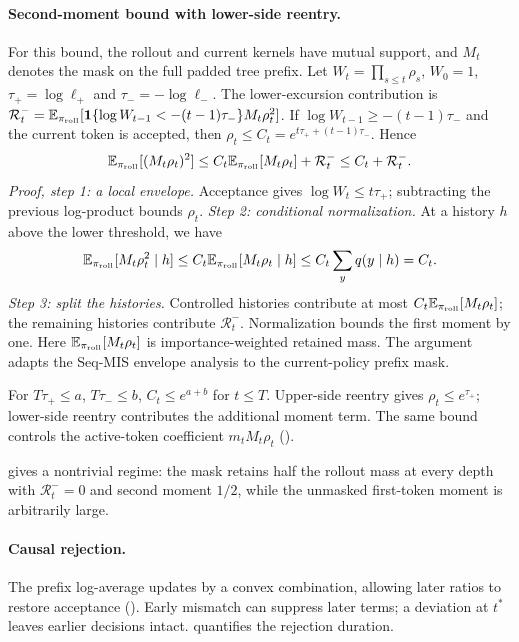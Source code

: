 \paragraph{Second-moment bound with lower-side reentry.}
For this bound, the rollout and current kernels have mutual support,
and $M_t$ denotes the mask on the full padded tree prefix.
Let $W_t=\prod_{s\le t}\rho_s$, $W_0=1$, $\tau_+=\log\ell_+$ and
$\tau_-=-\log\ell_-$. The lower-excursion contribution is
$\mathcal R_t^-=\mathbb E_{\pi_{\mathrm{roll}}}[
\mathbf 1\{\log W_{t-1}<-(t-1)\tau_-\}M_t\rho_t^2]$.
If $\log W_{t-1}\ge-(t-1)\tau_-$ and the current token is accepted,
then $\rho_t\le C_t=e^{t\tau_++(t-1)\tau_-}$. Hence
\[
 \mathbb E_{\pi_{\mathrm{roll}}}[(M_t\rho_t)^2]
 \le C_t\mathbb E_{\pi_{\mathrm{roll}}}[M_t\rho_t]+\mathcal R_t^-
 \le C_t+\mathcal R_t^-.
\]
\emph{Proof, step 1: a local envelope.} Acceptance gives
$\log W_t\le t\tau_+$; subtracting the previous log-product bounds $\rho_t$.
\emph{Step 2: conditional normalization.} At a history $h$ above the
lower threshold, we have
\[
 \mathbb E_{\pi_{\mathrm{roll}}}[M_t\rho_t^2\mid h]
 \le C_t\mathbb E_{\pi_{\mathrm{roll}}}[M_t\rho_t\mid h]
 \le C_t\sum_yq(y\mid h)=C_t.
\]
\emph{Step 3: split the histories.} Controlled histories contribute at most
$C_t\mathbb E_{\pi_{\mathrm{roll}}}[M_t\rho_t]$; the remaining histories contribute
$\mathcal R_t^-$. Normalization bounds the first moment by one.
Here $\mathbb E_{\pi_{\mathrm{roll}}}[M_t\rho_t]$ is importance-weighted retained mass.
The argument adapts the Seq-MIS envelope analysis
\citep[Section~1.3]{li2025sequencemasking} to the current-policy prefix mask.

For $T\tau_+\le a$, $T\tau_-\le b$, $C_t\le e^{a+b}$ for $t\le T$.
Upper-side reentry gives $\rho_t\le e^{\tau_+}$; lower-side reentry
contributes the additional moment term. The same bound controls the active-token
coefficient $m_tM_t\rho_t$ ().

 gives a nontrivial regime: the mask retains
half the rollout mass at every depth with $\mathcal R_t^-=0$ and second
moment $1/2$, while the unmasked first-token moment is arbitrarily large.

\paragraph{Causal rejection.}
The prefix log-average updates by a convex combination, allowing later
ratios to restore acceptance (). Early mismatch
can suppress later terms; a deviation at $t^*$ leaves earlier decisions
intact.  quantifies the rejection duration.

